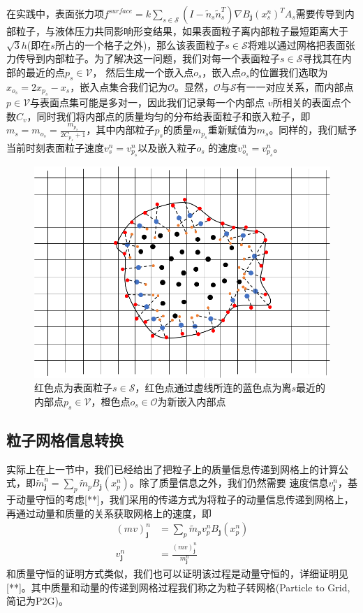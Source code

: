在实践中，表面张力项$f^{surface} = k\sum_{s\in \mathcal{S}}(I - \tilde{n}_s\tilde{n}_s^T)\nabla B_{\mathbf{j}}(x_s^n)^TA_s$需要传导到内部粒子，与液体压力共同影响形变结果，如果表面粒子离内部粒子最短距离大于
$\sqrt{3}h$(即在$s$所占的一个格子之外)，那么该表面粒子$s\in \mathcal{S}$将难以通过网格把表面张力传导到内部粒子。为了解决这一问题，我们对每一个表面粒子$s\in \mathcal{S}$寻找其在内部的最近的点$p_s \in \mathcal{V}$，
然后生成一个嵌入点$o_s$，嵌入点$o_s$的位置我们选取为$x_{o_s} = 2x_{p_s} - x_s$，嵌入点集合我们记为$\mathcal{O}$。显然，$\mathcal{O}$与$\mathcal{S}$有一一对应关系，而内部点$p\in\mathcal{V}$与表面点集可能是多对一，因此我们记录每一个内部点
$v$所相关的表面点个数$C_v$，同时我们将内部点的质量均匀的分布给表面粒子和嵌入粒子，即$m_s = m_{o_s} = \frac{m_{p_s}}{2C_{p_s} + 1}$，其中内部粒子$p_s$的质量$m_{p_s}$重新赋值为$m_s$。同样的，我们赋予当前时刻表面粒子速度$v_s^n = v_{p_s}^n$以及嵌入粒子$o_s$
的速度$v_{o_s}^n = v_{p_s}^n$。
\begin{figure}[htbp]
    \centering
    \includegraphics[scale=0.7]{./images/image16.png}
    \caption{红色点为表面粒子$s\in \mathcal{S}$，红色点通过虚线所连的蓝色点为离$s$最近的内部点$p_s\in \mathcal{V}$，橙色点$o_s\in \mathcal{O}$为新嵌入内部点}
    \label{fig: surface particle inserted}
\end{figure}
\subsection{粒子网格信息转换}
实际上在上一节中，我们已经给出了把粒子上的质量信息传递到网格上的计算公式，即$\tilde{m}^n_{\mathbf{j}} = \sum_p \tilde{m}_p B_{\mathbf{j}}(x_p^n)$。除了质量信息之外，我们仍然需要
速度信息$v_\mathbf{j}^n$，基于动量守恒的考虑[**]，我们采用的传递方式为将粒子的动量信息传递到网格上，再通过动量和质量的关系获取网格上的速度，即
\begin{align}
    (mv)_\mathbf{j}^n &= \sum_{p} \tilde{m}_p v_p^nB_{\mathbf{j}}(x_p^n)\\
    v_\mathbf{j}^n &= \frac{(mv)_\mathbf{j}^n}{m_{\mathbf{j}}^n} 
\end{align}
和质量守恒的证明方式类似，我们也可以证明该过程是动量守恒的，详细证明见[**]。其中质量和动量的传递到网格过程我们称之为粒子转网格(Particle to Grid,简记为P2G)。

